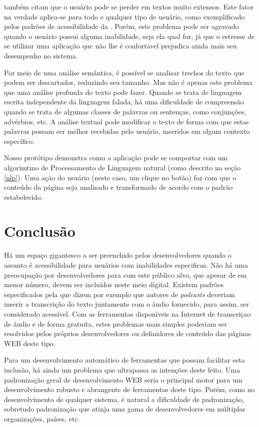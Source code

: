 \documentclass[
	12pt,				%
	oneside,			%
	a4paper,			%
	english,			%
	brazil				%
	]{abntex2ppgsi}
\begin{document}
 também citam que o usuário pode se perder em textos muito extensos. Este fator na verdade aplica-se para todo e qualquer tipo de usuário, como exemplificado pelos padrões de acessibilidade da . Porém, este problema pode ser agravado quando o usuário possui alguma inabilidade, seja ela qual for, já que o estresse de se utilizar uma aplicação que não lhe é confortável prejudica ainda mais seu desempenho no sistema. 

Por meio de uma análise semântica, é possível se analisar trechos do texto que podem ser descartados, reduzindo seu tamanho. Mas não é apenas este problema que uma análise profunda do texto pode fazer. Quando se trata de linguagem escrita independente da linguagem falada, há uma dificuldade de compreensão quando se trata de algumas classes de palavras ou sentenças, como conjunções, advérbios, etc. A análise textual pode modificar o texto de forma com que estas palavras possam ser melhor recebidas pelo usuário, inseridos em algum contexto específico.

Nosso protótipo demonstra como a aplicação pode se comportar com um algorimtmo de Processamento de Linguagem natural (como descrito na seção \ref{nlp}). Uma ação do usuário (neste caso, um clique no botão) faz com que o conteúdo da página seja analisado e transformado de acordo com o padrão estabelecido.

\chapter{Conclusão}

Há um espaço gigantesco a ser preenchido pelos desenvolvedores quando o assunto é acessibilidade para usuários com inabilidades especificas. Não há uma preocupação por desenvolvedores para com este público alvo, que apesar de em menor número, devem ser incluídos neste meio digital. Existem padrões especificados pela  que dizem por exemplo que autores de \textit{podcasts} deveriam inserir a transcrição do texto juntamente com o áudio fornecido, para assim, ser considerado acessível. Com as ferramentas disponíveis na Internet de transcriçao de áudio e de forma gratuita, estes problemas mais simples poderiam ser resolvidos pelos próprios desenvolvedores ou definidores de conteúdo das páginas WEB deste tipo.

Para um desenvolvimento automático de ferramentas que possam facilitar esta inclusão, há ainda um problema que ultrapassa as intenções deste feito. Uma padronização geral de desenvolvimento WEB seria o principal motor para um desenvolvimento robusto e abrangente de ferramentas deste tipo. Porém, como no desenvolvimento de qualquer sistema, é natural a dificuldade de padronização, sobretudo padronização que atinja uma gama de desenvolvedores em múltiplas organizações, países, etc. 
\end{document}
